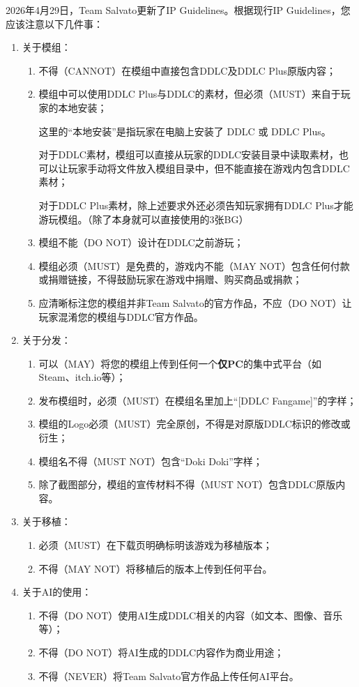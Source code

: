 \documentclass[../../Main.tex]{subfiles}
\begin{document}
2026年4月29日，Team Salvato更新了IP Guidelines。根据现行IP Guidelines，您应该注意以下几件事：
\begin{enumerate}
    \item 关于模组：
    \begin{enumerate}
        \item 不得（CANNOT）在模组中直接包含DDLC及DDLC Plus原版内容；
        \item 模组中可以使用DDLC Plus与DDLC的素材，但必须（MUST）来自于玩家的本地安装；
        \begin{Comment}
            这里的“本地安装”是指玩家在电脑上安装了 DDLC 或 DDLC Plus。
            
            对于DDLC素材，模组可以直接从玩家的DDLC安装目录中读取素材，也可以让玩家手动将文件放入模组目录中，但不能直接在游戏内包含DDLC素材；

            对于DDLC Plus素材，除上述要求外还必须告知玩家拥有DDLC Plus才能游玩模组。（除了本身就可以直接使用的3张BG）
        \end{Comment}
        \item 模组不能（DO NOT）设计在DDLC之前游玩；
        \item 模组必须（MUST）是免费的，游戏内不能（MAY NOT）包含任何付款或捐赠链接，不得鼓励玩家在游戏中捐赠、购买商品或捐款；
        \item 应清晰标注您的模组并非Team Salvato的官方作品，不应（DO NOT）让玩家混淆您的模组与DDLC官方作品。
    \end{enumerate}
    \item 关于分发：
    \begin{enumerate}
        \item 可以（MAY）将您的模组上传到任何一个\textbf{仅PC}的集中式平台（如Steam、itch.io等）；
        \item 发布模组时，必须（MUST）在模组名里加上“[DDLC Fangame]”的字样；
        \item 模组的Logo必须（MUST）完全原创，不得是对原版DDLC标识的修改或衍生；
        \item 模组名不得（MUST NOT）包含“Doki Doki”字样；
        \item 除了截图部分，模组的宣传材料不得（MUST NOT）包含DDLC原版内容。
    \end{enumerate}
    \item 关于移植：
    \begin{enumerate}
        \item 必须（MUST）在下载页明确标明该游戏为移植版本；
        \item 不得（MAY NOT）将移植后的版本上传到任何平台。
    \end{enumerate}
    \item 关于AI的使用：
    \begin{enumerate}
        \item 不得（DO NOT）使用AI生成DDLC相关的内容（如文本、图像、音乐等）；
        \item 不得（DO NOT）将AI生成的DDLC内容作为商业用途；
        \item 不得（NEVER）将Team Salvato官方作品上传任何AI平台。
    \end{enumerate}
\end{enumerate}
\end{document}
